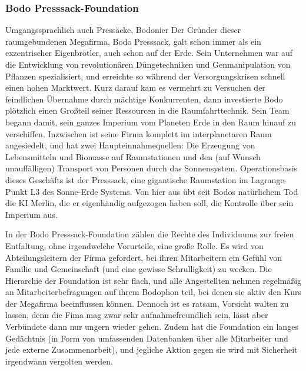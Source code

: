 \subsubsection{Bodo Presssack-Foundation}
Umgangssprachlich auch \glqq Pressäcke\grqq{}, \glqq Bodonier\grqq{}
Der Gründer dieser raumgebundenen Megafirma, Bodo Presssack, galt schon immer als ein exzentrischer Eigenbrötler, auch schon auf der Erde. Sein Unternehmen war auf die Entwicklung von revolutionären Düngetechniken und Genmanipulation von Pflanzen spezialisiert, und erreichte so während der Versorgungskrisen schnell einen hohen Marktwert. Kurz darauf kam es vermehrt zu Versuchen der feindlichen Übernahme durch mächtige Konkurrenten, dann investierte Bodo plötzlich einen Großteil seiner Ressourcen in die Raumfahrttechnik. Sein Team begann damit, sein ganzes Imperium vom Planeten Erde in den Raum hinauf zu verschiffen. Inzwischen ist seine Firma komplett im interplanetaren Raum angesiedelt, und hat zwei Haupteinnahmequellen: Die Erzeugung von Lebensmitteln und Biomasse auf Raumstationen und den (auf Wunsch unauffälligen) Transport von Personen durch das Sonnensystem. Operationsbasis dieses Geschäfts ist der \glqq Presssack\grqq{}, eine gigantische Raumstation im Lagrange-Punkt L3 des Sonne-Erde Systems. Von hier aus übt seit Bodos natürlichem Tod die KI Merlin, die er eigenhändig aufgezogen haben soll, die Kontrolle über sein Imperium aus.

In der Bodo Presssack-Foundation zählen die Rechte des Individuums zur freien Entfaltung, ohne irgendwelche Vorurteile, eine große Rolle. Es wird von Abteilungsleitern der Firma gefordert, bei ihren Mitarbeitern ein Gefühl von Familie und Gemeinschaft (und eine gewisse Schrulligkeit) zu wecken. Die Hierarchie der Foundation ist sehr flach, und alle Angestellten nehmen regelmäßig an Mitarbeiterbefragungen auf ihrem \glqq Bodophon\grqq{} teil, bei denen sie aktiv den Kurs der Megafirma beeinflussen können. Dennoch ist es ratsam, Vorsicht walten zu lassen, denn die Fima mag zwar sehr aufnahmefreundlich sein, lässt aber Verbündete dann nur ungern wieder gehen. Zudem hat die Foundation ein langes Gedächtnis (in Form von umfassenden Datenbanken über alle Mitarbeiter und jede externe Zusammenarbeit), und jegliche Aktion gegen sie wird mit Sicherheit irgendwann vergolten werden.
